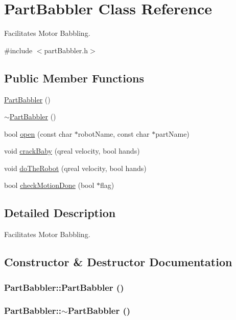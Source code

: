 \hypertarget{class_part_babbler}{
\section{PartBabbler Class Reference}
\label{class_part_babbler}
}


Facilitates Motor Babbling.  


{\ttfamily \#include $<$partBabbler.h$>$}\subsection*{Public Member Functions}
\begin{DoxyCompactItemize}
\item 
\hyperlink{class_part_babbler_adfba4a1da8c68ba88d3451b043bb8a05}{PartBabbler} ()
\item 
\hyperlink{class_part_babbler_a64204448180c922a7928f9450f2fa38a}{$\sim$PartBabbler} ()
\item 
bool \hyperlink{class_part_babbler_a9a1ff8917964eab2e95711dd9e0594e8}{open} (const char $\ast$robotName, const char $\ast$partName)
\item 
void \hyperlink{class_part_babbler_a156d8ef91d4f8d4dfe02f9d8982c5d06}{crackBaby} (qreal velocity, bool hands)
\item 
void \hyperlink{class_part_babbler_a16e6e6a7582a5fb5903604691de52070}{doTheRobot} (qreal velocity, bool hands)
\item 
bool \hyperlink{class_part_babbler_ac62a972e85492eaaa8cfc7dcd1c9488c}{checkMotionDone} (bool $\ast$flag)
\end{DoxyCompactItemize}


\subsection{Detailed Description}
Facilitates Motor Babbling. 

\subsection{Constructor \& Destructor Documentation}
\hypertarget{class_part_babbler_adfba4a1da8c68ba88d3451b043bb8a05}{
\subsubsection[{PartBabbler}]{\setlength{\rightskip}{0pt plus 5cm}PartBabbler::PartBabbler ()}}
\label{class_part_babbler_adfba4a1da8c68ba88d3451b043bb8a05}
\hypertarget{class_part_babbler_a64204448180c922a7928f9450f2fa38a}{
\subsubsection[{$\sim$PartBabbler}]{\setlength{\rightskip}{0pt plus 5cm}PartBabbler::$\sim$PartBabbler ()}}
\label{class_part_babbler_a64204448180c922a7928f9450f2fa38a}


